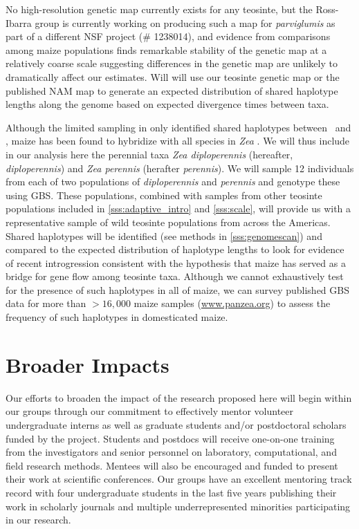 No high-resolution genetic map currently exists for any teosinte, but the Ross-Ibarra group is currently working on producing such a map for \emph{parviglumis} as part of a different NSF project (\# 1238014), and evidence from comparisons among maize populations finds remarkable stability of the genetic map at a relatively coarse scale \citep{bauer2013} suggesting differences in the genetic map are unlikely to dramatically affect our estimates. 
Will will use our teosinte genetic map or the published NAM map \citep{McMullen2009} to generate an expected distribution of shared haplotype lengths along the genome based on expected divergence times between taxa.

Although the limited sampling in \citet{Ross-Ibarra2009a} only identified shared haplotypes between \zm\ and \zl, maize has been found to hybridize with all species in \emph{Zea} \citep{Wilkes1977}.
We will thus include in our analysis here the perennial taxa \emph{Zea diploperennis} (hereafter, \emph{diploperennis}) and \emph{Zea perennis} (herafter \emph{perennis}).  
We will sample 12 individuals from each of two populations of \emph{diploperennis} and \emph{perennis} and genotype these using GBS.
These populations, combined with samples from other teosinte populations included in \ref{sss:adaptive_intro} and \ref{sss:scale}, will provide us with a representative sample of wild teosinte populations from across the Americas.
Shared haplotypes will be identified (see methods in \ref{sss:genomescan}) and compared to the expected distribution of haplotype lengths to look for evidence of recent introgression consistent with the hypothesis that maize has served as a bridge for gene flow among teosinte taxa.
Although we cannot exhaustively test for the presence of such haplotypes in all of maize, we can survey published GBS data for more than $>16,000$ maize samples (\url{www.panzea.org}) to assess the frequency of such haplotypes in domesticated maize.

\section*{Broader Impacts}

Our efforts to broaden the impact of the research proposed here will begin within our groups through our commitment to effectively mentor volunteer undergraduate interns as well as graduate students and/or postdoctoral scholars funded by the project. Students and postdocs will receive one-on-one training from the investigators and senior personnel on laboratory, computational, and field research methods.  Mentees will also be encouraged and funded to present their work at scientific conferences.  Our groups have an excellent mentoring track record with four undergraduate students in the last five years publishing their work in scholarly journals and multiple underrepresented minorities participating in our research.

